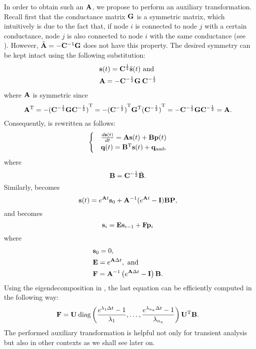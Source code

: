 In order to obtain such an $\mathbf{A}$, we propose to perform an auxiliary
transformation. Recall first that the conductance matrix $\mathbf{G}$ is a symmetric
matrix, which intuitively is due to the fact that, if node $i$ is connected to
node $j$ with a certain conductance, node $j$ is also connected to node $i$ with
the same conductance (see ). However, $\tilde{\mathbf{A}} = -\mathbf{C}^{-1} \mathbf{G}$
does not have this property. The desired symmetry can be kept intact using the
following substitution:
\begin{align} \elab{substitution}
  \begin{split}
    & \vs(t) = \m{C}^{\frac{1}{2}} \tvs(t) \text{ and} \\
    & \m{A} = -\m{C}^{-\frac{1}{2}} \m{G} \: \m{C}^{-\frac{1}{2}}
  \end{split}
\end{align}
where $\mathbf{A}$ is symmetric since
\[
  {\mathbf{A}}^\mathrm{T}
  = -{(\mathbf{C}^{-\frac{1}{2}} \mathbf{G} \mathbf{C}^{-\frac{1}{2}})}^\mathrm{T}
  = -{(\mathbf{C}^{-\frac{1}{2}})}^\mathrm{T} {\mathbf{G}}^\mathrm{T} {(\mathbf{C}^{-\frac{1}{2}})}^\mathrm{T}
  = -\mathbf{C}^{-\frac{1}{2}} \mathbf{G} \mathbf{C}^{-\frac{1}{2}}
  = \mathbf{A}.
\]
Consequently,  is rewritten as follows:
\begin{align*}
  \begin{cases}
    & \frac{d\mathbf{s}(t)}{dt} = \mathbf{A} \mathbf{s}(t) + \mathbf{B} \mathbf{p}(t) \\
    & \mathbf{q}(t) = {\mathbf{B}}^\mathrm{T} \mathbf{s}(t) + \mathbf{q}_{\mathrm{amb}}
  \end{cases}
\end{align*}
where
\[
  \mathbf{B} = \mathbf{C}^{-\frac{1}{2}} \tilde{\mathbf{B}}.
\]
Similarly,  becomes
\[
  \mathbf{s}(t) = e^{\mathbf{A} t} \mathbf{s}_0 + \mathbf{A}^{-1} (e^{\mathbf{A} t} - \mathbf{I}) \mathbf{B} \mathbf{P},
\]
and  becomes
\begin{equation} \elab{recurrent-equation}
  \vs_i = \m{E} \vs_{i - 1} + \m{F} \vp_i
\end{equation}
where
\begin{align*}
  & \mathbf{s}_0 = 0, \\
  & \mathbf{E} = e^{\mathbf{A} \Delta t}, \text{ and} \\
  & \mathbf{F} = \mathbf{A}^{-1} \left( e^{\mathbf{A} \Delta t} - \mathbf{I} \right) \mathbf{B}.
\end{align*}
Using the eigendecomposition in , the last equation can
be efficiently computed in the following way:
\[
  \mathbf{F} = \mathbf{U} \: \mathrm{diag}\left(\frac{e^{\lambda_1 \Delta t} - 1}{\lambda_1}, \dots, \frac{e^{\lambda_{n_\mathrm{n}} \Delta t} - 1}{\lambda_{n_\mathrm{n}}}\right) {\mathbf{U}}^\mathrm{T} \mathbf{B}.
\]
The performed auxiliary transformation is helpful not only for transient
analysis but also in other contexts as we shall see later on.

